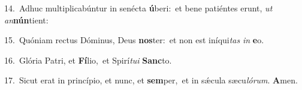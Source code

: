 {\numbfont\textcolor{\numbcolor}{14.}}~Adhuc multiplicabúntur in senécta \textbf{ú}\-beri:~\star et bene patiéntes erunt, \textit{ut} \textit{an}\-\textbf{nún}tient:\par
{\numbfont\textcolor{\numbcolor}{15.}}~Quóniam rectus Dóminus, Deus \textbf{nos}\-ter:~\star et non est iníqui\textit{tas} \textit{in} \textbf{e}\-o.\par
{\numbfont\textcolor{\numbcolor}{16.}}~Glória Patri, et \textbf{Fí}\-lio,~\star et Spirí\-\textit{tu}\-\textit{i} \textbf{Sanc}\-to.\par
{\numbfont\textcolor{\numbcolor}{17.}}~Sicut erat in princípio, et nunc, et \textbf{sem}\-per,~\star et in sǽcula sæcu\-\textit{ló}\-\textit{rum}. \textbf{A}\-men.\par
